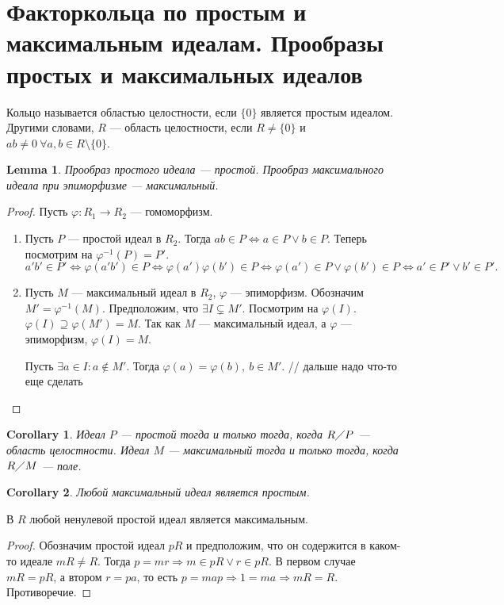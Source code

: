 \documentclass[11pt]{book}
\newcommand{\po}{\diagup}
\theoremstyle{definition}
\theoremstyle{plain}
\theoremstyle{plain}
\newtheorem{lm}{Lemma}
\newtheorem{cor}{Corollary}
\theoremstyle{definition}
\theoremstyle{remark}
\begin{document}
\section{Факторкольца по простым и максимальным идеалам. Прообразы простых и максимальных идеалов}
\begin{defn}
    Кольцо называется {\sf областью целостности}, если $ \{0\}$ является простым идеалом. Другими словами, $ R $ --- область целостности, если  $ R \ne \{0\}$ и $ ab \ne  0 ~ \forall a, b \in R \setminus \{0\}$.
\end{defn}
\begin{lm}
    Прообраз простого идеала --- простой. Прообраз максимального идеала при эпиморфизме --- максимальный.
\end{lm}
\begin{proof}
    Пусть $ \varphi : R_1 \to R_2 $ --- гомоморфизм.
    \begin{enumerate}
        \item Пусть $ P$ ---  простой идеал в $ R_2$.
	    Тогда 
$ ab \in  P \Longleftrightarrow  a \in  P \vee b \in  P$.
Теперь посмотрим на $ \varphi^{-1}(P) = P'$. 
\[
    a'b' \in P' \Longleftrightarrow \varphi (a'b') \in P \Longleftrightarrow \varphi (a') \varphi (b') \in P \Longleftrightarrow \varphi (a') \in P \vee \varphi (b') \in P \Longleftrightarrow a' \in P' \vee b' \in P'
.\] 
\item Пусть $ M$ --- максимальный идеал в $ R_2$,  $ \varphi $ --- эпиморфизм.
    Обозначим $ M' = \varphi^{-1}(M)$.
    Предположим, что $ \exists I \subsetneq M'$. Посмотрим на $ \varphi (I)$. $ \varphi (I) \supseteq \varphi (M') = M$. Так как $ M$ --- максимальный идеал, а $ \varphi $ --- эпиморфизм,  $ \varphi (I) = M$.

    Пусть $ \exists a \in I: a \not\in M'$. Тогда $ \varphi (a) = \varphi (b), ~ b \in M'$.
    // дальше надо что-то еще сделать
    \end{enumerate}
\end{proof}
\begin{cor}
    Идеал $ P$ --- простой  тогда и только тогда, когда $ R \po P$ --- область целостности. 
    Идеал $ M$ --- максимальный  тогда и только тогда, когда  $ R \po M$ --- поле.
\end{cor}
\begin{cor}\label{cor_max_p}
    Любой максимальный идеал является простым.
\end{cor}
\begin{thm}
    В $ R$ любой ненулевой простой идеал является максимальным.
\end{thm}
\begin{proof}
    Обозначим простой идеал $ pR$ и предположим, что он содержится в каком-то идеале $ mR \ne R$.
    Тогда  $ p = mr \Longrightarrow m \in  pR \vee r \in  pR$. В первом случае $ mR = pR$, а втором  $ r = pa$, то есть $ p = map \Longrightarrow  1 = ma \Longrightarrow  mR = R$. Противоречие. 
\end{proof}
\end{document}
